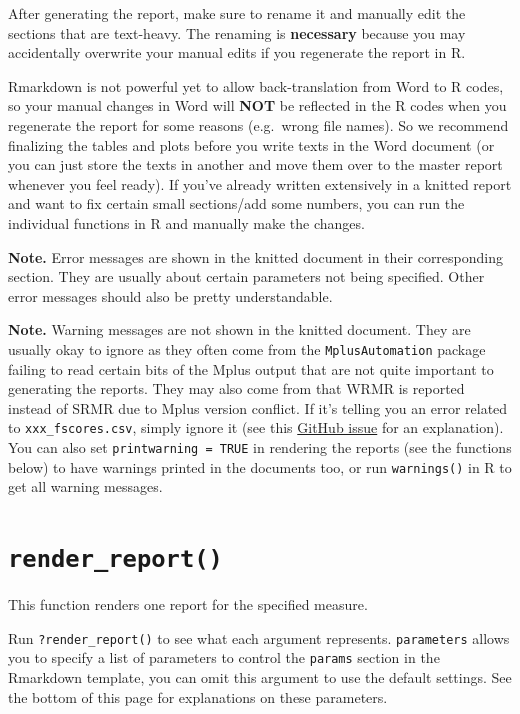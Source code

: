 \documentclass[
]{book}
\begin{document}
After generating the report, make sure to rename it and manually edit the sections that are text-heavy. The renaming is \textbf{necessary} because you may accidentally overwrite your manual edits if you regenerate the report in R.

Rmarkdown is not powerful yet to allow back-translation from Word to R codes, so your manual changes in Word will \textbf{NOT} be reflected in the R codes when you regenerate the report for some reasons (e.g.~wrong file names). So we recommend finalizing the tables and plots before you write texts in the Word document (or you can just store the texts in another and move them over to the master report whenever you feel ready). If you've already written extensively in a knitted report and want to fix certain small sections/add some numbers, you can run the individual functions in R and manually make the changes.

\textbf{Note.} Error messages are shown in the knitted document in their corresponding section. They are usually about certain parameters not being specified. Other error messages should also be pretty understandable.

\textbf{Note.} Warning messages are not shown in the knitted document. They are usually okay to ignore as they often come from the \texttt{MplusAutomation} package failing to read certain bits of the Mplus output that are not quite important to generating the reports. They may also come from that WRMR is reported instead of SRMR due to Mplus version conflict. If it's telling you an error related to \texttt{xxx\_fscores.csv}, simply ignore it (see this \href{https://github.com/nyuglobalties/mrautomatr/issues/20}{GitHub issue} for an explanation). You can also set \texttt{printwarning\ =\ TRUE} in rendering the reports (see the functions below) to have warnings printed in the documents too, or run \texttt{warnings()} in R to get all warning messages.

\hypertarget{render_report}{%
\section{\texorpdfstring{\texttt{render\_report()}}{render\_report()}}\label{render_report}}

This function renders one report for the specified measure.

Run \texttt{?render\_report()} to see what each argument represents. \texttt{parameters} allows you to specify a list of parameters to control the \texttt{params} section in the Rmarkdown template, you can omit this argument to use the default settings. See the bottom of this page for explanations on these parameters.
\end{document}
